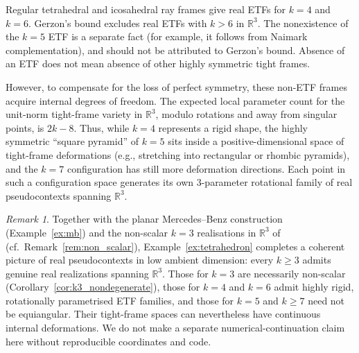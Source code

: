 \documentclass[
  twocolumn,
  aps,
  pra,
  floatfix,
  amsmath,amssymb,
  longbibliography
]{revtex4-2}
\theoremstyle{definition}
\theoremstyle{remark}
\newtheorem{remark}[theorem]{Remark}
\begin{document}
Regular tetrahedral and icosahedral ray frames give real ETFs for $k=4$
and $k=6$.  Gerzon's bound excludes real ETFs with $k>6$ in
$\mathbb R^3$.  The nonexistence of the $k=5$ ETF is a separate fact
(for example, it follows from Naimark complementation), and should not
be attributed to Gerzon's bound.  Absence of an ETF does not mean absence
of other highly symmetric tight frames.

However, to compensate for the loss of perfect symmetry, these
non-ETF frames acquire internal degrees of freedom.  The expected
local parameter count for the unit-norm tight-frame variety in
$\mathbb{R}^3$, modulo rotations and away from singular points, is
$2k-8$.  Thus, while $k=4$ represents a rigid shape, the highly
symmetric ``square pyramid'' of $k=5$ sits inside a positive-dimensional
space of tight-frame deformations (e.g., stretching into rectangular
or rhombic pyramids), and the $k=7$ configuration has still more
deformation directions.  Each point in such a configuration space
generates its own $3$-parameter rotational family of real
pseudocontexts spanning $\mathbb{R}^3$.

\begin{remark}
Together with the planar Mercedes--Benz construction
(Example~\ref{ex:mb}) and the non-scalar $k=3$ realisations in
$\mathbb{R}^3$ of \cite{2023-navara-svozil}
(cf.~Remark~\ref{rem:non_scalar}), Example~\ref{ex:tetrahedron}
completes a coherent picture of real pseudocontexts in low ambient
dimension: every $k\ge 3$ admits genuine real realizations spanning
$\mathbb{R}^3$. Those for $k=3$ are necessarily non-scalar
(Corollary~\ref{cor:k3_nondegenerate}), those for $k=4$ and $k=6$
admit highly rigid, rotationally parametrised ETF families, and those for
$k=5$ and $k\ge7$ need not be equiangular.  Their tight-frame spaces can
nevertheless have continuous internal deformations.  We do not make a
separate numerical-continuation claim here without reproducible
coordinates and code.
\end{remark}
\end{document}
